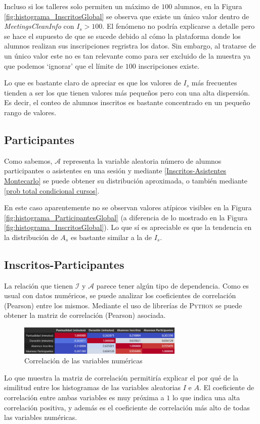 \documentclass[11pt,a4paper]{book}
\theoremstyle{definition}%
\begin{document}
                Incluso si los talleres solo permiten un máximo de $100$ alumnos, en la Figura \ref{fig:histograma_InscritosGlobal} se observa que existe un único valor dentro de \textit{MeetingsCleanInfo} con $I_s>100$. El fenómeno no podría explicarse a detalle pero se hace el supuesto de que se sucede debido al cómo la plataforma donde los alumnos realizan sus inscripciones regristra los datos. Sin embargo, al tratarse de un único valor este no es tan relevante como para ser excluido de la muestra ya que podemos `ignorar' que el límite de $100$ inscripciones existe.

                Lo que es bastante claro de apreciar es que los valores de $I_s$ más frecuentes tienden a ser los que tienen valores más pequeños pero con una alta dispersión. Es decir, el conteo de alumnos inscritos es bastante concentrado en un pequeño rango de valores.
            \subsection{Participantes}
                Como sabemos, $\mathcal{A}$ representa la variable aleatoria número de alumnos participantes o asistentes en una sesión y mediante \ref{Inscritos-Asistentes Montecarlo} se puede obtener su distribución aproximada, o también mediante \ref{prob total condicional cursos}.

                En este caso aparentemente no se observan valores atípicos visibles en la Figura \ref{fig:histograma_ParticipantesGlobal} (a diferencia de lo mostrado en la Figura \ref{fig:histograma_InscritosGlobal}). Lo que sí es apreciable es que la tendencia en la distribución de $A_s$ es bastante similar a la de $I_s$.
            \subsection{Inscritos-Participantes}
                La relación que tienen $\mathcal{I}$ y $\mathcal{A}$ parece tener algún tipo de dependencia. Como es usual con datos numéricos, se puede analizar los coeficientes de correlación (Pearson) entre los mismos. Mediante el uso de librerías de \textsc{Python} se puede obtener la matriz de correlación (Pearson) asociada.
                \begin{figure}[H]
                    \centering
                    \includegraphics[width=0.7\textwidth]{Sources/corrmatrix_NumericalFeatures.png}
                    \caption{Correlación de las variables numéricas}
                    \label{fig:corrmatrix_NumericalFeatures}
                \end{figure}
                Lo que muestra la matriz de correlación permitiría explicar el por qué de la similitud entre los histogramas de las variables aleatorias $I$ e $A$. El coeficiente de correlación entre ambas variables es muy próxima a $1$ lo que indica una alta correlación positiva, y además es el coeficiente de correlación más alto de todas las variables numéricas.
                
\end{document}
